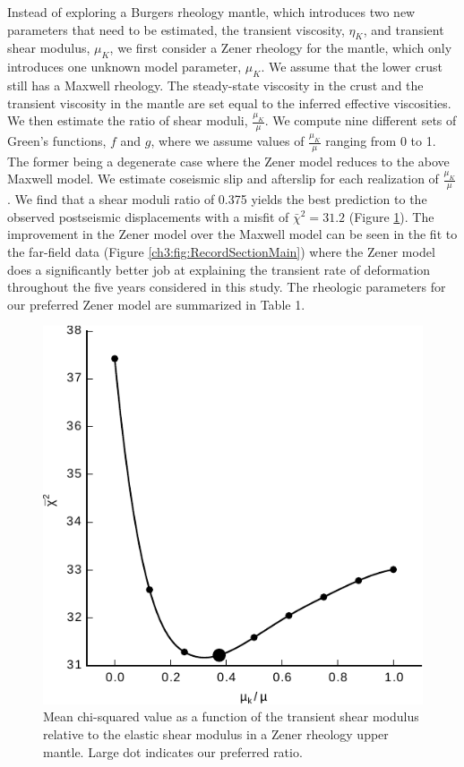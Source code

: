 Instead of exploring a Burgers rheology mantle, which introduces two new parameters that need to be estimated, the transient viscosity, $\eta_{K}$, and transient shear modulus, $\mu_{K}$, we first consider a Zener rheology for the mantle, which only introduces one unknown model parameter, $\mu_{K}$.  We assume that the lower crust still has a Maxwell rheology. The steady-state viscosity in the crust and the transient viscosity in the mantle are set equal to the inferred effective viscosities.  We then estimate the ratio of shear moduli, $\frac{\mu_K}{\mu}$. We compute nine different sets of Green's functions, $f$ and $g$, where we assume values of $\frac{\mu_K}{\mu}$ ranging from 0 to 1. The former being a degenerate case where the Zener model reduces to the above Maxwell model.  We estimate coseismic slip and afterslip for each realization of $\frac{\mu_K}{\mu}$.  We find that a shear moduli ratio of 0.375 yields the best prediction to the observed postseismic displacements with a misfit of $\bar\chi^2=31.2$ (Figure \ref{ch3:fig:ShearModulusRatio}).  The improvement in the Zener model over the Maxwell model can be seen in the fit to the far-field data (Figure \ref{ch3:fig:RecordSectionMain}) where the Zener model does a significantly better job at explaining the transient rate of deformation throughout the five years considered in this study.  The rheologic parameters for our preferred Zener model are summarized in Table 1.

\begin{figure}\label{ch3:fig:ShearModulusRatio}
\includegraphics[scale=1.0]{ch3/figures/2016jb013114-f13}
\caption{Mean chi-squared value as a function of the transient shear modulus relative to the elastic shear modulus in a Zener rheology upper mantle. Large dot indicates our preferred ratio.}
\end{figure}

